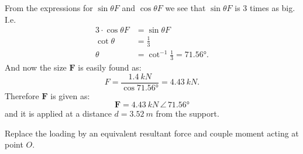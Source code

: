 \documentclass[a4paper]{article}
\begin{document}
From the expressions for $\sin \theta F$ and $\cos \theta F$ we see that $\sin \theta F$ is 3 times as big. I.e.
\begin{align*}
  3 \cdot \cos \theta F &= \sin \theta F \\
  \cot \theta &= \frac{1}{3} \\
  \theta &= \cot^{-1} \frac{1}{3} = \ang{71,56}
.\end{align*}
And now the size $\textbf{F}$ is easily found as:
\[ 
F = \frac{\qty{1,4}{kN}}{\cos \ang{71,56} } = \qty{4,43}{kN}
.\]
Therefore $\textbf{F}$ is given as:
\[ 
\textbf{F} = \qty{4,43}{kN} \, \angle \, \ang{71,56}
\]
and it is applied at a distance $d = \qty{3,52}{m}$ from the support. 


Replace the loading by an equivalent resultant force and couple moment acting at point $O$.
\end{document}
